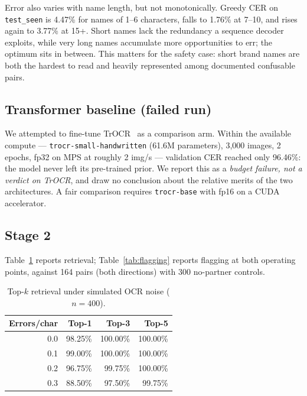 \documentclass[conference]{IEEEtran}
\begin{document}
Error also varies with name length, but not monotonically. Greedy CER on \texttt{test\_seen} is 4.47\% for names of 1--6 characters, falls to 1.76\% at 7--10, and rises again to 3.77\% at 15+. Short names lack the redundancy a sequence decoder exploits, while very long names accumulate more opportunities to err; the optimum sits in between. This matters for the safety case: short brand names are both the hardest to read and heavily represented among documented confusable pairs.

\subsection{Transformer baseline (failed run)}
We attempted to fine-tune TrOCR~\cite{li2023trocr} as a comparison arm. Within
the available compute --- \texttt{trocr-small-handwritten} (61.6M parameters),
3{,}000 images, 2 epochs, fp32 on MPS at roughly 2 img/s --- validation CER
reached only 96.46\%: the model never left its pre-trained prior. We report this
as a \emph{budget failure, not a verdict on TrOCR}, and draw no conclusion about
the relative merits of the two architectures. A fair comparison requires
\texttt{trocr-base} with fp16 on a CUDA accelerator.

\subsection{Stage 2}
Table~\ref{tab:retrieval} reports retrieval; Table~\ref{tab:flagging} reports
flagging at both operating points, against 164 pairs (both directions) with 300
no-partner controls.

\begin{table}[t]
\caption{Top-$k$ retrieval under simulated OCR noise ($n=400$).}
\label{tab:retrieval}
\centering
\begin{tabular}{@{}rrrr@{}}
\toprule
Errors/char & Top-1 & Top-3 & Top-5 \\
\midrule
0.0 & 98.25\% & 100.00\% & 100.00\% \\
0.1 & 99.00\% & 100.00\% & 100.00\% \\
0.2 & 96.75\% & 99.75\%  & 100.00\% \\
0.3 & 88.50\% & 97.50\%  & 99.75\%  \\
\bottomrule
\end{tabular}
\end{table}
\end{document}
